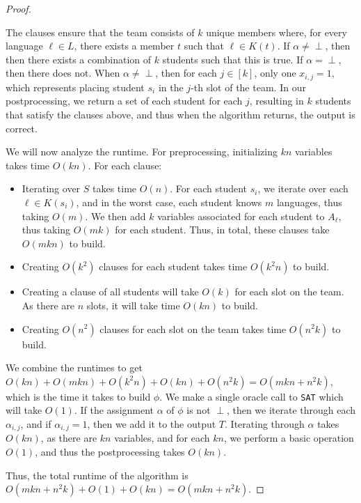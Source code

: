 \documentclass[11pt]{scrartcl}
\theoremstyle{dotlessP}
\theoremstyle{dotlessN}
\begin{document}
\begin{enumerate}[(a)]
\begin{proof}
\begin{itemize}
\begin{itemize}
	\end{itemize}
	The clauses ensure that the team consists of $k$ unique members where, for every language $\ell \in L$, there exists a member $t$ such that $\ell \in K(t)$. If $\alpha \neq \perp$, then then there exists a combination of $k$ students such that this is true. If $\alpha = \perp$, then there does not.
	When $\alpha \neq \perp$, then for each $j \in [k]$, only one $x_{i,j} = 1$, which represents placing student $s_i$ in the $j$-th slot of the team. In our postprocessing, we return a set of each student for each $j$, resulting in $k$ students that satisfy the clauses above, and thus when the algorithm returns, the output is correct.
			\end{itemize}
			We will now analyze the runtime. For preprocessing, initializing $kn$ variables takes time $O(kn)$. For each clause:
			\begin{itemize}
				\item Iterating over $S$ takes time $O(n)$. For each student $s_i$, we iterate over each $\ell \in K(s_i)$, and in the worst case, each student knows $m$ languages, thus taking  $O(m)$. We then add $k$ variables associated for each student to $A_\ell$, thus taking $O( mk)$ for each student. Thus, in total, these clauses take $O(mkn)$ to build.
				\item Creating  $O(k^2)$ clauses for each student takes time $O(k^2n)$ to build.
				\item Creating  a clause of all students will take $O(k)$ for each slot on the team. As there are $n$ slots, it will take time $O(kn)$ to build.
				\item Creating  $O(n^2)$ clauses for each slot on the team takes time $O(n^2k)$ to build.
			\end{itemize}
			We combine the runtimes to get $O(kn) + O(mkn) + O(k^2n) + O(kn) + O(n^2k) = O(mkn + n^2k)$, which is the time it takes to build $\phi$. We make a single oracle call to \texttt{SAT} which will take $O(1)$. If the assignment  $\alpha$ of  $\phi$ is not $\perp$, then we iterate through each $\alpha_{i,j}$, and if  $\alpha_{i,j} = 1$, then we add it to the output $T$. Iterating through $\alpha$ takes $O(kn)$, as there are $kn$ variables, and for each $kn$, we perform a basic operation $O(1)$, and thus the postprocessing takes $O(kn)$. 

			Thus, the total runtime of the algorithm is $O(mkn + n^2k) + O(1) + O(kn) = O(mkn + n^2k)$.
		\end{proof}
\end{enumerate}
\end{document}
